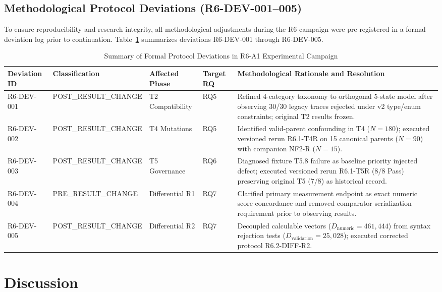 \documentclass[conference]{IEEEtran}
\begin{document}
\subsection{Methodological Protocol Deviations (R6-DEV-001--005)}
\label{sec:r6_deviations}
To ensure reproducibility and research integrity, all methodological adjustments during the R6 campaign were pre-registered in a formal deviation log prior to continuation. Table~\ref{tab:deviations} summarizes deviations R6-DEV-001 through R6-DEV-005.

\begin{table}[t]
\caption{Summary of Formal Protocol Deviations in R6-A1 Experimental Campaign}
\label{tab:deviations}
\centering
\small
\begin{tabular}{@{}llllp{}@{}}
\toprule
Deviation ID & Classification & Affected Phase & Target RQ & Methodological Rationale and Resolution \\
\midrule
R6-DEV-001 & POST\_RESULT\_CHANGE & T2 Compatibility & RQ5 & Refined 4-category taxonomy to orthogonal 5-state model after observing 30/30 legacy traces rejected under v2 type/enum constraints; original T2 results frozen. \\
R6-DEV-002 & POST\_RESULT\_CHANGE & T4 Mutations & RQ5 & Identified valid-parent confounding in T4 ($N=180$); executed versioned rerun R6.1-T4R on 15 canonical parents ($N=90$) with companion NF2-R ($N=15$). \\
R6-DEV-003 & POST\_RESULT\_CHANGE & T5 Governance & RQ6 & Diagnosed fixture T5.8 failure as baseline priority injected defect; executed versioned rerun R6.1-T5R (8/8 Pass) preserving original T5 (7/8) as historical record. \\
R6-DEV-004 & PRE\_RESULT\_CHANGE  & Differential R1 & RQ7 & Clarified primary measurement endpoint as exact numeric score concordance and removed comparator serialization requirement prior to observing results. \\
R6-DEV-005 & POST\_RESULT\_CHANGE & Differential R2 & RQ7 & Decoupled calculable vectors ($D_{\text{numeric}} = 461,444$) from syntax rejection tests ($D_{\text{validation}} = 25,028$); executed corrected protocol R6.2-DIFF-R2. \\
\bottomrule
\end{tabular}
\end{table}

\section{Discussion}
\end{document}
